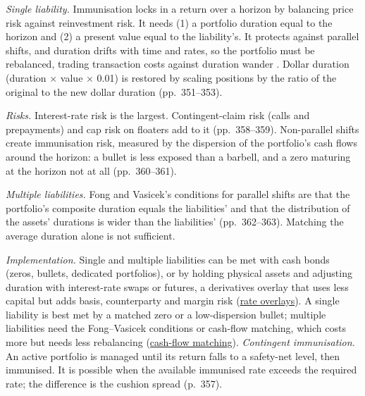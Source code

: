 \begin{qfmethod}\label{meth:immunisation-liabilities}
 \emph{Single liability.} Immunisation locks in a return over a horizon by balancing price risk against reinvestment risk. It needs (1) a portfolio duration equal to the horizon and (2) a present value equal to the liability's. It protects against parallel shifts, and duration drifts with time and rates, so the portfolio must be rebalanced, trading transaction costs against duration wander \citep[chap.~6, sec.~4.1.1, pp.~348--351]{managing-investment-portfolios-2007}. Dollar duration (duration $\times$ value $\times$ 0.01) is restored by scaling positions by the ratio of the original to the new dollar duration (pp.~351--353).

\emph{Risks.} Interest-rate risk is the largest. Contingent-claim risk (calls and prepayments) and cap risk on floaters add to it (pp.~358--359). Non-parallel shifts create immunisation risk, measured by the dispersion of the portfolio's cash flows around the horizon: a bullet is less exposed than a barbell, and a zero maturing at the horizon not at all (pp.~360--361).

\emph{Multiple liabilities.} Fong and Vasicek's conditions for parallel shifts are that the portfolio's composite duration equals the liabilities' and that the distribution of the assets' durations is wider than the liabilities' (pp.~362--363). Matching the average duration alone is not sufficient.

\emph{Implementation.} Single and multiple liabilities can be met with cash bonds (zeros, bullets, dedicated portfolios), or by holding physical assets and adjusting duration with interest-rate swaps or futures, a derivatives overlay that uses less capital but adds basis, counterparty and margin risk (\hyperref[meth:forward-commitment-risk-overlays]{rate overlays}). A single liability is best met by a matched zero or a low-dispersion bullet; multiple liabilities need the Fong--Vasicek conditions or cash-flow matching, which costs more but needs less rebalancing (\hyperref[meth:liability-matching-ladders]{cash-flow matching}). \emph{Contingent immunisation.} An active portfolio is managed until its return falls to a safety-net level, then immunised. It is possible when the available immunised rate exceeds the required rate; the difference is the cushion spread (p.~357).


\end{qfmethod}
